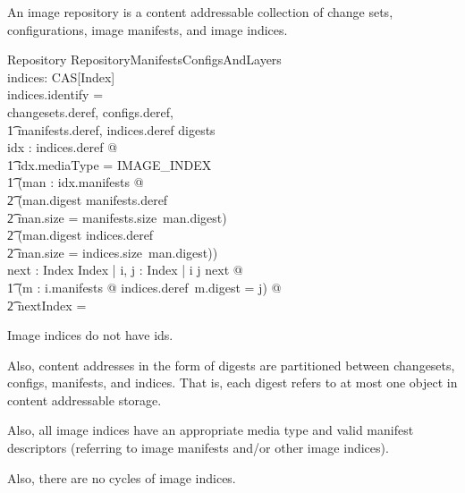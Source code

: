 \documentclass[a4paper,twoside,12pt]{article}
\begin{document}
An image repository is a content addressable collection of change sets, configurations, image manifests, and image indices.
\begin{schema}{Repository}
  RepositoryManifestsConfigsAndLayers \\
  indices: CAS[Index] \\
\where
  indices.identify = \emptyset \\
\also
  \langle \dom changesets.deref, \dom configs.deref, \\
  \t1 \dom manifests.deref, \dom indices.deref  \rangle \partition digests \\
\also
  \forall idx : \ran indices.deref @ \\
  \t1 idx.mediaType = IMAGE\_INDEX \land \\
  \t1 (\forall man : \ran idx.manifests @ \\
    \t2 (man.digest \in \dom manifests.deref \land \\
    \t2 man.size = manifests.size~man.digest) \lor \\
    \t2 (man.digest \in \dom indices.deref \land \\
    \t2 man.size = indices.size~man.digest)) \\
\also
  \exists next : Index \rel Index | \forall i, j : Index | i \mapsto j \in next @ \\
  \t1 (\exists m : \ran i.manifests @ indices.deref~m.digest = j) @ \\
  \t2 next\plus \cap \id Index = \emptyset \\
\end{schema}
Image indices do not have ids.

Also, content addresses in the form of digests are partitioned between changesets, configs, manifests, and indices.
That is, each digest refers to at most one object in content addressable storage.

Also, all image indices have an appropriate media type and valid manifest descriptors (referring to image manifests and/or other image indices).

Also, there are no cycles of image indices.


\clearpage

\appendix
\end{document}
